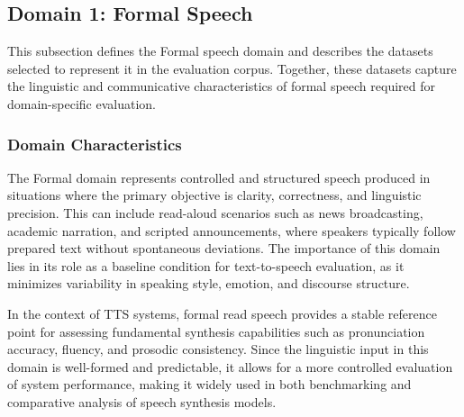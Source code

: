 \documentclass[a4paper,fleqn]{cas-dc}
\begin{document}
    
    \subsection{Domain 1: Formal Speech}\label{sec:domain-formal}

    This subsection defines the Formal speech domain and describes the datasets selected to represent it in the evaluation corpus. Together, these datasets capture the linguistic and communicative characteristics of formal speech required for domain-specific evaluation.

    \subsubsection{Domain Characteristics}
    \indent The Formal domain represents controlled and structured speech produced in situations where the primary objective is clarity, correctness, and linguistic precision. This can include read-aloud scenarios such as news broadcasting, academic narration, and scripted announcements, where speakers typically follow prepared text without spontaneous deviations. The importance of this domain lies in its role as a baseline condition for text-to-speech evaluation, as it minimizes variability in speaking style, emotion, and discourse structure.
    
    \indent In the context of TTS systems, formal read speech provides a stable reference point for assessing fundamental synthesis capabilities such as pronunciation accuracy, fluency, and prosodic consistency. Since the linguistic input in this domain is well-formed and predictable, it allows for a more controlled evaluation of system performance, making it widely used in both benchmarking and comparative analysis of speech synthesis models.
    
\end{document}
